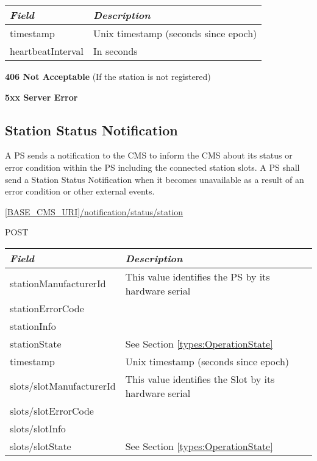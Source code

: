 \begin{tabularx}{\linewidth}{ | l | X | }
  \hline
  \textit{Field} & \textit{Description} \\
  \hline \hline
  timestamp & Unix timestamp (seconds since epoch) \\
  heartbeatInterval & In seconds \\
    \hline
\end{tabularx}

\textbf{406 Not Acceptable} (If the station is not registered)

\textbf{5xx Server Error}

\subsection{Station Status Notification}

A \acs{PS} sends a notification to the \acs{CMS} to inform the \acs{CMS} about its status or error condition within the \acs{PS} including the connected station slots. A \acs{PS} shall send a Station Status Notification when it becomes unavailable as a result of an error condition or other external events.

 \url{[BASE_CMS_URI]/notification/status/station}

 POST

\newpage
{}
\begin{table}[!h]
\vspace{-7mm}
\begin{tabularx}{\linewidth}{ | l | X | }
  \hline
  \textit{Field} & \textit{Description} \\
  \hline \hline
  stationManufacturerId 		& This value identifies the PS by its hardware serial\\
  stationErrorCode & \\
  stationInfo & \\
  stationState & See Section \ref{types:OperationState} \\
  timestamp & Unix timestamp (seconds since epoch) \\
  slots/slotManufacturerId 	& This value identifies the Slot by its hardware serial \\
  slots/slotErrorCode & \\
  slots/slotInfo & \\
  slots/slotState & See Section \ref{types:OperationState} \\
  \hline
\end{tabularx}
\end{table}

